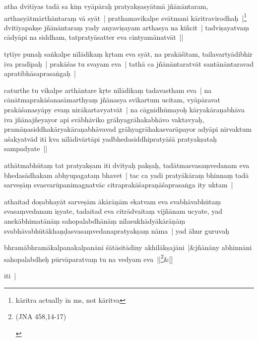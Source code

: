 \documentclass[article,12pt,a4paper]{memoir}
\begin{document}
	  \pstart atha dvitīyas tadā sa kiṃ vyāpāraḥ pratyakṣasyātmā jñānāntaram, arthasyātmārthāntaraṃ vā syāt | prathamavikalpe svātmani kāritravirodhaḥ |\footnote{kāritra actually in ms, not kāritva} dvitīyapakṣe jñānāntaraṃ yady anyaviṣayam arthasya na kiñcit | tadviṣayatvaṃ cādyāpi na siddham, tatpratyāsatter eva cintyamānatvāt ||
	\pend
      

	  \pstart tṛtīye punaḥ saṅkalpe nīlādikaṃ kṛtam eva syāt, na prakāśitam, tailavartyādibhir iva pradīpaḥ | prakāśas tu svayam eva | tathā ca jñānāntaratvāt santānāntaravad apratibhāsaprasaṅgaḥ |
	\pend
      

	  \pstart caturthe tu vikalpe arthāntare kṛte nīlādikaṃ tadavastham eva | na cānātmaprakāśanasāmarthyaṃ jñānasya svīkartum ucitam, vyāpāravat prakāśanasyāpy evaṃ nirākartavyatvāt | na cāgnidhūmayoḥ kāryakāraṇabhāva iva jñānajñeyayor api svābhāviko grāhyagrāhakabhāvo vaktavyaḥ, pramāṇasiddhakāryakāraṇabhāvavad grāhyagrāhakasvarūpayor adyāpi nirvaktum aśakyatvād iti kva nīlādivārtāpi yadbhedasiddhipratyāśā pratyakṣataḥ sampadyate ||
	\pend
      

	  \pstart athātmabhūtaṃ tat pratyakṣam iti dvītyaḥ pakṣaḥ, tadātmasvasaṃvedanam eva bhedasādhakam abhyupagataṃ bhavet | tac ca yadi pratyākāraṃ bhinnaṃ tadā sarveṣāṃ svasvarūpanimagnatvāc citraprakāśapraṇāśaprasaṅga ity uktam |
	\pend
      

	  \pstart athaitad doṣabhayāt sarveṣām ākārāṇām ekatvam eva svabhāvabhūtaṃ svasaṃvedanam iṣyate, tadaitad eva citrādvaitaṃ vijñānam ucyate, yad anekābhimatānāṃ sahopalabdhānāṃ nīlasukhādyākārāṇāṃ svabhāvabhūtākhaṇḍasvasaṃvedanapratyakṣaṃ nāma | yad āhur guruvaḥ
	\pend
      
	    
	    \stanza[\smallbreak]
	bhramābhramākalpanakalpanāni śātāsitādīny akhilākṣajāni |&jñānāny abhinnāni sahopalabdheḥ pūrvāparatvaṃ tu na vedyam eva ||\footnote{\begin{english}(JNA 458,14-17)\end{english}}\&[\smallbreak]


	

	  \pstart iti |
	\pend
      
\end{document}
